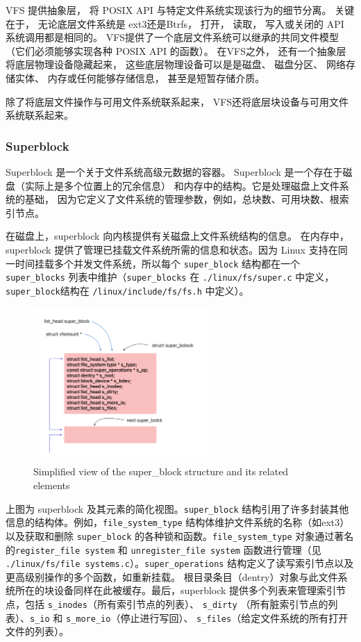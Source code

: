 \documentclass[UTF8,a4paper]{ctexart}
\begin{document}
VFS 提供抽象层，
将 POSIX API
与特定文件系统实现该行为的细节分离。
关键在于，
无论底层文件系统是
ext3还是Btrfs，
打开，
读取，
写入或关闭的 API
系统调用都是相同的。
VFS提供了一个底层文件系统可以继承的共同文件模型
（它们必须能够实现各种
POSIX API
的函数）。
在VFS之外，
还有一个抽象层将底层物理设备隐藏起来，
这些底层物理设备可以是是磁盘、
磁盘分区、
网络存储实体、
内存或任何能够存储信息，
甚至是短暂存储介质。

除了将底层文件操作与可用文件系统联系起来，
VFS还将底层块设备与可用文件系统联系起来。

\subsubsection{Superblock}

Superblock 是一个关于文件系统高级元数据的容器。
Superblock
是一个存在于磁盘（实际上是多个位置上的冗余信息）
和内存中的结构。它是处理磁盘上文件系统的基础，
因为它定义了文件系统的管理参数，例如，总块数、可用块数、根索引节点。

在磁盘上，superblock
向内核提供有关磁盘上文件系统结构的信息。
在内存中，superblock
提供了管理已挂载文件系统所需的信息和状态。因为 Linux
支持在同一时间挂载多个并发文件系统，所以每个 \texttt{super\_block}
结构都在一个 \texttt{super\_blocks} 列表中维护（\texttt{super\_blocks}
在 \texttt{./linux/fs/super.c} 中定义，\texttt{super\_block}结构在
\texttt{/linux/include/fs/fs.h} 中定义）。

\begin{figure}[H]
    \centering
    \includegraphics[width=0.6\textwidth]{Simplified view of the super_block structure and its related elements.png}
    \caption{Simplified view of the super\_block structure and its related elements}
\end{figure}

上图为 superblock 及其元素的简化视图。\texttt{super\_block}
结构引用了许多封装其他信息的结构体。例如，\texttt{file\_system\_type}
结构体维护文件系统的名称（如ext3）以及获取和删除 \texttt{super\_block}
的各种锁和函数。\texttt{file\_system\_type}
对象通过著名的\texttt{register\_file\ system} 和
\texttt{unregister\_file\ system} 函数进行管理（见
\texttt{./linux/fs/file\ systems.c}）。\texttt{super\_operations}
结构定义了读写索引节点以及更高级别操作的多个函数，如重新挂载。
根目录条目（dentry）对象与此文件系统所在的块设备同样在此被缓存。最后，superblock
提供多个列表来管理索引节点，包括
\texttt{s\_inodes}（所有索引节点的列表）、
\texttt{s\_dirty}
（所有脏索引节点的列表）、\texttt{s\_io}
和
\texttt{s\_more\_io}（停止进行写回）、
\texttt{s\_files}（给定文件系统的所有打开文件的列表）。
\end{document}
